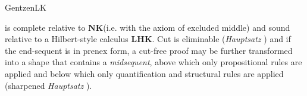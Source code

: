 \begin{entry}{GentzenLK}
\newcommand{\LHK}{\ensuremath{\mathbf{LHK}}\xspace}
\newcommand{\NK}{\ensuremath{\mathbf{NK}}\xspace}


\begin{technicalities}
\LK is complete relative to \NK (i.e. \NJ {} with the axiom of excluded middle) and sound relative to a Hilbert-style calculus \LHK \cite{lk:Gentzen1935a}. Cut is eliminable (\emph{Hauptsatz} \cite{lk:Gentzen1935}) and if the end-sequent is in prenex form, a cut-free proof may be further transformed into a shape that contains a \emph{midsequent}, above which only propositional rules are applied and below which only quantification and structural rules are applied (sharpened \emph{Hauptsatz} \cite{lk:Gentzen1935a}).
\end{technicalities}

\end{entry}
\let\LKAX\undefined
\let\LKUI\undefined
\let\LKBI\undefined
\let\LKLL\undefined
\let\LKRL\undefined
\let\LKRLN\undefined

\let\SALLL  \undefined
\let\SALLR  \undefined
\let\SEXL   \undefined
\let\SEXR   \undefined
\let\SANDL  \undefined
\let\SANDR  \undefined
\let\SORL   \undefined
\let\SORR   \undefined
\let\SIMPL  \undefined
\let\SIMPR  \undefined
\let\SNEGL  \undefined
\let\SNEGR  \undefined
\let\SWEAKL \undefined
\let\SWEAKR \undefined
\let\SCONTRL\undefined
\let\SCONTRR\undefined
\let\SEXCHL \undefined
\let\SEXCHR \undefined
\let\SCUT   \undefined
\let\SDEF   \undefined

\let\ALLL  \undefined
\let\ALLR  \undefined
\let\EXL   \undefined
\let\EXR   \undefined
\let\ANDL  \undefined
\let\ANDR  \undefined
\let\ORL   \undefined
\let\ORR   \undefined
\let\IMPL  \undefined
\let\IMPR  \undefined
\let\NEGL  \undefined
\let\NEGR  \undefined
\let\WEAKL \undefined
\let\WEAKR \undefined
\let\CONTRL\undefined
\let\CONTRR\undefined
\let\EXCHL \undefined
\let\EXCHR \undefined
\let\CUT   \undefined
\let\DEF   \undefined